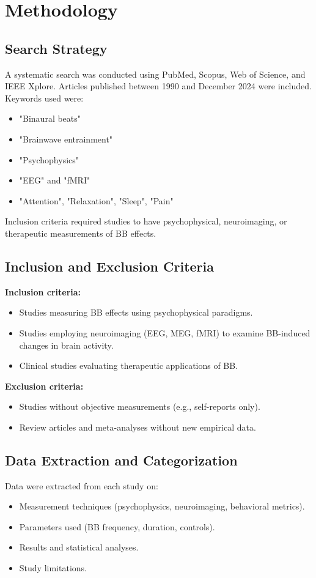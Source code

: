 \documentclass[12pt]{article}
\begin{document}
\section{Methodology}

\subsection{Search Strategy}
A systematic search was conducted using PubMed, Scopus, Web of Science, and IEEE Xplore. Articles published between 1990 and December 2024 were included. Keywords used were:
\begin{itemize}
    \item "Binaural beats"
    \item "Brainwave entrainment"
    \item "Psychophysics"
    \item "EEG" and "fMRI"
    \item "Attention", "Relaxation", "Sleep", "Pain"
\end{itemize}
Inclusion criteria required studies to have psychophysical, neuroimaging, or therapeutic measurements of BB effects.

\subsection{Inclusion and Exclusion Criteria}
\textbf{Inclusion criteria:}
\begin{itemize}
    \item Studies measuring BB effects using psychophysical paradigms.
    \item Studies employing neuroimaging (EEG, MEG, fMRI) to examine BB-induced changes in brain activity.
    \item Clinical studies evaluating therapeutic applications of BB.
\end{itemize}

\textbf{Exclusion criteria:}
\begin{itemize}
    \item Studies without objective measurements (e.g., self-reports only).
    \item Review articles and meta-analyses without new empirical data.
\end{itemize}

\subsection{Data Extraction and Categorization}
Data were extracted from each study on:
\begin{itemize}
    \item Measurement techniques (psychophysics, neuroimaging, behavioral metrics).
    \item Parameters used (BB frequency, duration, controls).
    \item Results and statistical analyses.
    \item Study limitations.
\end{itemize}
\end{document}
